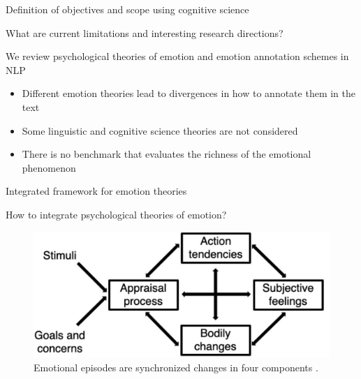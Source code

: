 \documentclass[10pt]{beamer}
\begin{document}
\begin{frame}{Definition of objectives and scope using cognitive science}

What are current limitations and interesting research directions?

\pause
\vspace{0.5cm}

We review psychological theories of emotion and emotion annotation schemes in NLP

\pause
\vspace{0.5cm}


\begin{itemize}[<+->]
    \item Different emotion theories lead to divergences in how to annotate them in the text
    \item Some linguistic and cognitive science theories are not considered
    \item There is no benchmark that evaluates the richness of the emotional phenomenon
\end{itemize}




    
\end{frame}

\begin{frame}{Integrated framework for emotion theories}

How to integrate psychological theories of emotion?

\pause
\vspace{0.5cm}


\begin{figure}
    \centering
    \includegraphics[width=0.8\linewidth]{img/scherer_integrated_framework.png}
    \caption{Emotional episodes are synchronized changes in four components \citep{schererTheoryConvergenceEmotion2022a}.}
    \label{fig:placeholder}
\end{figure}
    
\end{frame}
\end{document}
